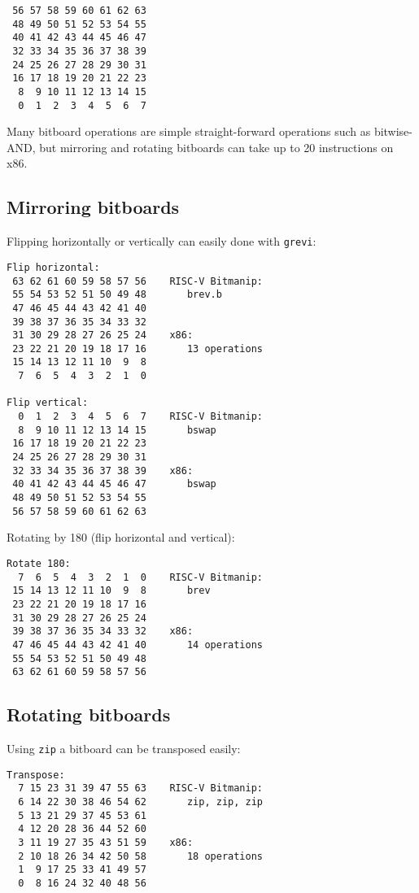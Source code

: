\begin{verbatim}
 56 57 58 59 60 61 62 63
 48 49 50 51 52 53 54 55
 40 41 42 43 44 45 46 47
 32 33 34 35 36 37 38 39
 24 25 26 27 28 29 30 31
 16 17 18 19 20 21 22 23
  8  9 10 11 12 13 14 15
  0  1  2  3  4  5  6  7
\end{verbatim}

Many bitboard operations are simple straight-forward operations such as
bitwise-AND, but mirroring and rotating bitboards can take up to 20
instructions on x86.

\subsection{Mirroring bitboards}

Flipping horizontally or vertically can easily done with {\tt grevi}:

\begin{verbatim}
Flip horizontal:
 63 62 61 60 59 58 57 56    RISC-V Bitmanip:
 55 54 53 52 51 50 49 48       brev.b
 47 46 45 44 43 42 41 40
 39 38 37 36 35 34 33 32
 31 30 29 28 27 26 25 24    x86:
 23 22 21 20 19 18 17 16       13 operations
 15 14 13 12 11 10  9  8
  7  6  5  4  3  2  1  0

Flip vertical:
  0  1  2  3  4  5  6  7    RISC-V Bitmanip:
  8  9 10 11 12 13 14 15       bswap
 16 17 18 19 20 21 22 23
 24 25 26 27 28 29 30 31
 32 33 34 35 36 37 38 39    x86:
 40 41 42 43 44 45 46 47       bswap
 48 49 50 51 52 53 54 55
 56 57 58 59 60 61 62 63
\end{verbatim}

Rotating by 180 (flip horizontal and vertical):

\begin{verbatim}
Rotate 180:
  7  6  5  4  3  2  1  0    RISC-V Bitmanip:
 15 14 13 12 11 10  9  8       brev
 23 22 21 20 19 18 17 16
 31 30 29 28 27 26 25 24
 39 38 37 36 35 34 33 32    x86:
 47 46 45 44 43 42 41 40       14 operations
 55 54 53 52 51 50 49 48
 63 62 61 60 59 58 57 56
\end{verbatim}

\subsection{Rotating bitboards}

Using {\tt zip} a bitboard can be transposed easily:
\label{transposebitboard}

\begin{verbatim}
Transpose:
  7 15 23 31 39 47 55 63    RISC-V Bitmanip:
  6 14 22 30 38 46 54 62       zip, zip, zip
  5 13 21 29 37 45 53 61
  4 12 20 28 36 44 52 60
  3 11 19 27 35 43 51 59    x86:
  2 10 18 26 34 42 50 58       18 operations
  1  9 17 25 33 41 49 57
  0  8 16 24 32 40 48 56
\end{verbatim}

